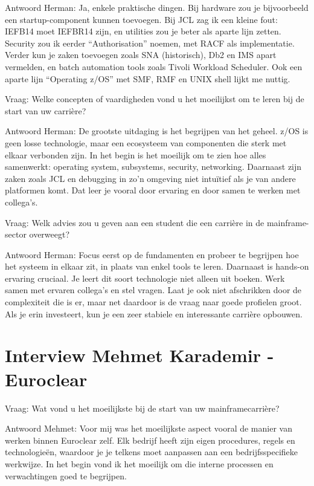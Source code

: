 Antwoord Herman: Ja, enkele praktische dingen. Bij hardware zou je bijvoorbeeld een startup-component kunnen toevoegen. Bij JCL zag ik een kleine fout: IEFB14 moet IEFBR14 zijn, en utilities zou je beter als aparte lijn zetten. Security zou ik eerder “Authorisation” noemen, met RACF als implementatie. Verder kun je zaken toevoegen zoals SNA (historisch), Db2 en IMS apart vermelden, en batch automation tools zoals Tivoli Workload Scheduler. Ook een aparte lijn “Operating z/OS” met SMF, RMF en UNIX shell lijkt me nuttig.

Vraag: Welke concepten of vaardigheden vond u het moeilijkst om te leren bij de start van uw carrière?

Antwoord Herman: De grootste uitdaging is het begrijpen van het geheel. z/OS is geen losse technologie, maar een ecosysteem van componenten die sterk met elkaar verbonden zijn. In het begin is het moeilijk om te zien hoe alles samenwerkt: operating system, subsystems, security, networking. Daarnaast zijn zaken zoals JCL en debugging in zo’n omgeving niet intuïtief als je van andere platformen komt. Dat leer je vooral door ervaring en door samen te werken met collega’s.

Vraag: Welk advies zou u geven aan een student die een carrière in de mainframe-sector overweegt?

Antwoord Herman: Focus eerst op de fundamenten en probeer te begrijpen hoe het systeem in elkaar zit, in plaats van enkel tools te leren. Daarnaast is hands-on ervaring cruciaal. Je leert dit soort technologie niet alleen uit boeken. Werk samen met ervaren collega’s en stel vragen. Laat je ook niet afschrikken door de complexiteit die is er, maar net daardoor is de vraag naar goede profielen groot. Als je erin investeert, kun je een zeer stabiele en interessante carrière opbouwen.

\section{Interview Mehmet Karademir - Euroclear}

Vraag: Wat vond u het moeilijkste bij de start van uw mainframecarrière?

Antwoord Mehmet: Voor mij was het moeilijkste aspect vooral de manier van werken binnen Euroclear zelf. Elk bedrijf heeft zijn eigen procedures, regels en technologieën, waardoor je je telkens moet aanpassen aan een bedrijfsspecifieke werkwijze. In het begin vond ik het moeilijk om die interne processen en verwachtingen goed te begrijpen.

